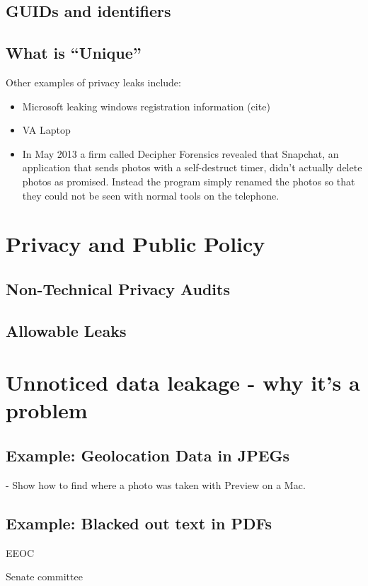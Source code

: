 \subsection{GUIDs and identifiers}
\subsection{What is ``Unique''}


Other examples of privacy leaks include:
\begin{itemize}
\item Microsoft leaking windows registration information (cite)
\item VA Laptop
\item In May 2013 a firm called Decipher Forensics revealed that Snapchat, an application that sends photos with a
  self-destruct timer, didn't actually delete photos as
  promised. Instead the program simply renamed the photos so that they
  could not be seen with normal tools on the telephone\cite{ksl-snap-chat}.
\end{itemize}



\section{Privacy and Public Policy }

\subsection{Non-Technical Privacy Audits}

\subsection{Allowable Leaks}

\section{Unnoticed data leakage - why it's a problem}
\subsection{Example: Geolocation Data in JPEGs}
  - Show how to find where a photo was taken with Preview on a Mac. 
\subsection{Example: Blacked out text in PDFs}
EEOC

Senate committee

